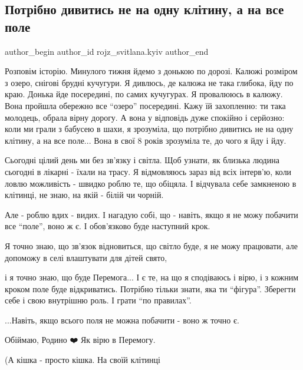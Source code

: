  
 
 
 
 
 
\subsection{Потрібно дивитись не на одну клітину, а на все поле}
\label{sec:20_12_2022.fb.rojz_svitlana.kyiv.1.pole}
 
\ifcmt
 author_begin
   author_id rojz_svitlana.kyiv
 author_end
\fi

Розповім історію. Минулого тижня йдемо з донькою по дорозі. Калюжі розміром з
озеро, снігові  брудні кучугури. Я дивлюсь, де калюжа не така глибока, йду по
краю. Донька йде посередині, по самих кучугурах. Я провалююсь в калюжу. Вона
пройшла обережно все \enquote{озеро} посередині. Кажу їй захопленно: ти така молодець,
обрала вірну дорогу. А вона у відповідь дуже спокійно і серйозно: коли ми грали
з бабусею в шахи, я зрозуміла, що потрібно дивитись не на одну клітину, а на
все поле... Вона в свої 8 років зрозуміла те, до чого я йду і йду. 

Сьогодні цілий день ми без зв'язку і світла. Щоб узнати, як близька людина
сьогодні в лікарні - їхали на трасу. Я відмовляюсь зараз від всіх інтерв'ю,
коли ловлю можливість - швидко роблю те, що обіцяла. І відчувала себе замкненою
в клітинці, не знаю, на якій - білій чи чорній. 

Але - роблю вдих - видих. І нагадую собі, що - навіть, якщо я не можу побачити
все \enquote{поле}, воно ж є. І обов'язково буде наступний крок. 

Я точно знаю, що зв'язок відновиться, що світло буде, я не можу працювати, але
допоможу в селі влаштувати для дітей свято, 

і я точно знаю, що буде Перемога... І є те, на що я сподіваюсь і вірю, і з
кожним кроком поле буде відкриватись. Потрібно тільки знати, яка ти \enquote{фігура}.
Зберегти себе і свою внутрішню роль. І грати \enquote{по правилах}. 

...Навіть, якщо всього поля не можна побачити - воно ж точно є. 

Обіймаю, Родино ❤️ Як вірю в Перемогу. 

(А кішка - просто кішка. На своїй клітинці 🙂

